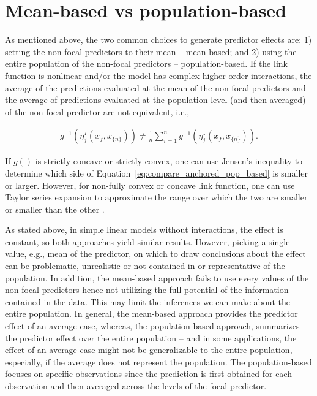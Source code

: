 \documentclass[10pt,letterpaper]{article}
\newcommand{\nset}[1]{#1_{\{n\}}}
\begin{document}
\section*{Mean-based vs population-based}

As mentioned above, the two common choices to generate predictor effects are: 1) setting the non-focal predictors to their mean -- mean-based; and 2) using the entire population of the non-focal predictors -- population-based. If the link function is nonlinear and/or the model has complex higher order interactions, the average of the predictions evaluated at the mean of the non-focal predictors and the average of predictions evaluated at the population level (and then averaged) of the non-focal predictor are not equivalent, i.e.,

\begin{align}\label{eq:compare_anchored_pop_based}
g^{-1} \left(\eta_j^\star(\bar{x}_f, \nset{\bar{x}})\right) \neq \frac{1}{n} \sum_{i=1}^n{ g^{-1} \left(\eta_j^\star(\bar{x}_f, \nset{x})\right)}.
\end{align}

If $g()$ is strictly concave or strictly convex, one can use Jensen's inequality to determine which side of Equation~\ref{eq:compare_anchored_pop_based} is smaller or larger. However, for non-fully convex or concave link function, one can use Taylor series expansion to approximate the range over which the two are smaller or smaller than the other \cite{hanmer2013behind}. 


As stated above, in simple linear models without interactions, the effect is constant, so both approaches yield similar results. However, picking a single value, e.g., mean of the predictor, on which to draw conclusions about the effect can be problematic, unrealistic or not contained in or representative of the population. In addition, the mean-based approach fails to use every values of the non-focal predictors hence not utilizing the full potential of the information contained in the data. This may limit the inferences we can make about the entire population. In general, the mean-based approach provides the predictor effect of an average case, whereas, the population-based approach, summarizes the predictor effect over the entire population -- and in some applications, the effect of an average case might not be generalizable to the entire population, especially, if the average does not represent the population. The population-based focuses on specific observations since the prediction is first obtained for each observation and then averaged across the levels of the focal predictor.
\end{document}
